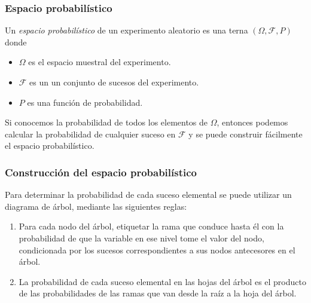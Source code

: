 \begin{frame}
\frametitle{Espacio probabilístico}
\begin{definicion}
Un \emph{espacio probabilístico} de un experimento aleatorio es una terna $(\Omega,\mathcal{F},P)$ donde 
\begin{itemize}
	\item $\Omega$ es el espacio muestral del experimento.
	\item $\mathcal{F}$ es un un conjunto de sucesos del experimento.
	\item $P$ es una función de probabilidad.
\end{itemize} 
\end{definicion}

Si conocemos la probabilidad de todos los elementos de $\Omega$, entonces podemos calcular la probabilidad de cualquier suceso en $\mathcal{F}$ y se puede construir fácilmente el espacio probabilístico.
\end{frame}


\begin{frame}
\frametitle{Construcción del espacio probabilístico}
Para determinar la probabilidad de cada suceso elemental se puede utilizar un diagrama de árbol, mediante las siguientes reglas:
\begin{enumerate}
\item Para cada nodo del árbol, etiquetar la rama que conduce hasta él con la probabilidad de que la variable en ese nivel tome el valor del nodo, condicionada por los sucesos correspondientes a sus nodos antecesores en el árbol.
\item La probabilidad de cada suceso elemental en las hojas del árbol es el producto de las probabilidades de las ramas que van desde la raíz a la hoja del árbol.
\end{enumerate}

\begin{center}
\end{center}
\end{frame}


